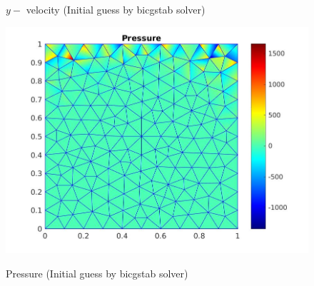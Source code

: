 \documentclass[a4paper]{book}
\begin{document}
\begin{figure}
\begin{minipage}[c]{0.3\textwidth}
    \caption{$y-$ velocity (Initial guess by bicgstab solver)}
  \label{y_vel_navier_stoke_bicgstab_lid}
  \end{minipage}
  \begin{minipage}[c]{0.67\textwidth}
    \includegraphics[width=\textwidth]{lid_newton_pressure_bicgstab.jpg}
  \end{minipage}\hfill
  \begin{minipage}[c]{0.3\textwidth}
    \caption{Pressure (Initial guess by bicgstab solver)}
  \label{pressure_navier_stoke_bicgstab_lid}
  \end{minipage}
\caption{\label{lid_driven_cavity_n_s_bicgstab}}
\end{figure}
\end{document}
